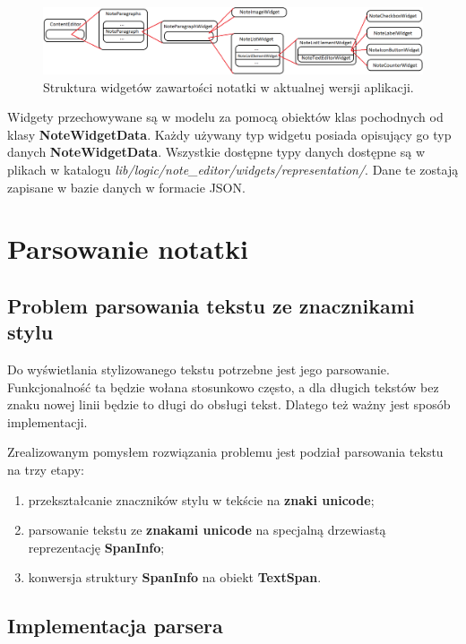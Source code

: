 \begin{figure}[ht]
    \centering
    \includegraphics[width=\linewidth]{images/struktura_widgetow_w_notatce.png}
    \caption{Struktura widgetów zawartości notatki w aktualnej wersji aplikacji.}
    \label{fig:struktura-widgetow}
\end{figure}

Widgety przechowywane są w modelu za pomocą obiektów klas pochodnych od klasy \textbf{NoteWidgetData}. Każdy używany typ widgetu posiada opisujący go typ danych \textbf{NoteWidgetData}. Wszystkie dostępne typy danych dostępne są w plikach w katalogu \textit{lib/logic/note\_{}editor/widgets/representation/}. Dane te zostają zapisane w bazie danych w formacie JSON.

\section{Parsowanie notatki}

\subsection{Problem parsowania tekstu ze znacznikami stylu}

Do wyświetlania stylizowanego tekstu potrzebne jest jego parsowanie. Funkcjonalność ta będzie wołana stosunkowo często, a dla długich tekstów bez znaku nowej linii będzie to długi do obsługi tekst. Dlatego też ważny jest sposób implementacji.

Zrealizowanym pomysłem rozwiązania problemu jest podział parsowania tekstu na trzy etapy:
\begin{enumerate}
    \setlength\itemsep{0mm}
    \item przekształcanie znaczników stylu w tekście na \textbf{znaki unicode};
    \item parsowanie tekstu ze \textbf{znakami unicode} na specjalną drzewiastą reprezentację \textbf{SpanInfo};
    \item konwersja struktury \textbf{SpanInfo} na obiekt \textbf{TextSpan}.
\end{enumerate}

\subsection{Implementacja parsera}

